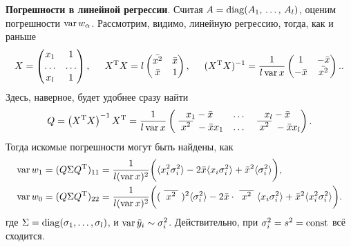\textbf{Погрешности в линейной регрессии}. Считая $A = \mathop{\mathrm{diag}}\nolimits(A_1,\, \ldots,\, A_l)$, оценим погрешности $\mathop{\mathrm{var}}\nolimits w_\alpha$. Рассмотрим, видимо,  линейную регрессию, тогда, как и раньше
\begin{equation*}
    X = \begin{pmatrix}
        x_1 & 1 \\
        \ldots & \ldots \\
        x_l & 1
    \end{pmatrix},
    \hspace{5 mm} 
    X^{\text{T}} X = l \begin{pmatrix}
        \bar{x^2} & \bar{x}  \\
        \bar{x} & 1  \\
    \end{pmatrix},
    \hspace{5 mm} 
    (X^{\text{T}} X)^{-1} = \frac{1}{l \mathop{\mathrm{var}}\nolimits x} \begin{pmatrix}
        1 & - \bar{x}  \\
        - \bar{x} & \bar{x^2}  \\
    \end{pmatrix}.
    .
\end{equation*}
Здесь, наверное, будет удобнее сразу найти
\begin{equation*}
        Q  = \left(X\T X\right)^{-1} X\T = \frac{1}{l \var x} \begin{pmatrix}
        x_1-\bar{x} & \ldots & x_l - \bar{x}  \\
        \xbar{x^2}- \bar{x} x_1 & \ldots & \xbar{x^2}- \bar{x} x_l  \\
    \end{pmatrix}.
\end{equation*}
Тогда искомые погрешности могут быть найдены, как
\begin{align*}
    \var w_1 &= (Q \Sigma Q\T)_{11} = \frac{1}{l (\var x)^2} 
    \bigg(\langle x_i^2 \sigma_i^2\rangle - 2 \bar{x} \langle x_i \sigma_i^2\rangle + \bar{x}^2 \langle \sigma_i^2\rangle\bigg)
    , \\
    \var w_0 &= (Q \Sigma Q\T)_{22} =  \frac{1}{l (\var x)^2} \bigg( 
        (\xbar{x^2})^2 \langle \sigma_i^2\rangle - 2 \bar{x} \cdot \xbar{x^2} \langle x_i \sigma_i^2\rangle + \bar{x}^2 \langle x_i^2 \sigma_i ^2\rangle
    \bigg).
\end{align*}
где $\Sigma = \mathop{\mathrm{diag}}\nolimits(\sigma_1, \ldots, \sigma_l)$, и $\mathop{\mathrm{var}}\nolimits \tilde{y}_i \sim \sigma_i^2$. Действительно, при $\sigma_i^2 = s^2 = \textnormal{const}$ всё сходится. 